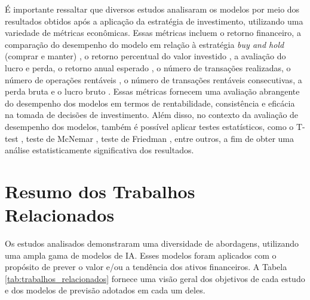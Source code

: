 É importante ressaltar que diversos estudos analisaram os modelos por meio dos resultados obtidos após a aplicação da estratégia de investimento, utilizando uma variedade de métricas econômicas. Essas métricas incluem o retorno financeiro, a comparação do desempenho do modelo em relação à estratégia \textit{buy and hold} (comprar e manter) \cite{Ciniro_Econometric}, o retorno percentual do valor investido \cite{Chaojie_Stock}, a avaliação do lucro e perda, o retorno anual esperado \cite{Charlene}, o número de transações realizadas, o número de operações rentáveis \cite{C_Veeramani_Exploration}, o número de transações rentáveis consecutivas, a perda bruta e o lucro bruto \cite{Jerzy_Deep}. Essas métricas fornecem uma avaliação abrangente do desempenho dos modelos em termos de rentabilidade, consistência e eficácia na tomada de decisões de investimento. Além disso, no contexto da avaliação de desempenho dos modelos, também é possível aplicar testes estatísticos, como o T-test \cite{kim2015t}, teste de McNemar \cite{mcnemar1947note}, teste de Friedman \cite{sheldon1996use}, entre outros, a fim de obter uma análise estatisticamente significativa dos resultados.

\section{Resumo dos Trabalhos Relacionados}
\label{subsec:resumo}
Os estudos analisados demonstraram uma diversidade de abordagens, utilizando uma ampla gama de modelos de \ac{IA}. Esses modelos foram aplicados com o propósito de prever o valor e/ou a tendência dos ativos financeiros. A Tabela \ref{tab:trabalhos_relacionados} fornece uma visão geral dos objetivos de cada estudo e dos modelos de previsão adotados em cada um deles.

